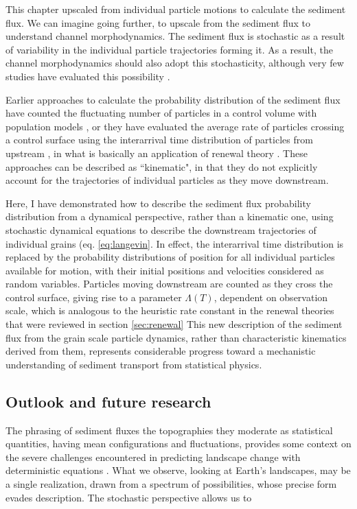 This chapter upscaled from individual particle motions to calculate the sediment flux.
We can imagine going further, to upscale from the sediment flux to understand channel morphodynamics.
The sediment flux is stochastic as a result of variability in the individual particle trajectories forming it.
As a result, the channel morphodynamics should also adopt this stochasticity, although very few studies have evaluated this possibility \citep{Bohorquez2016, Jerolmack2005}.




Earlier approaches to calculate the probability distribution of the sediment flux have counted the fluctuating number of particles in a control volume with population models \citep{Ancey2008,Ancey2014}, or they have evaluated the average rate of particles crossing a control surface using the interarrival time distribution of particles from upstream \citep{Turowski2010,Ancey2020,Heyman2013}, in what is basically an application of renewal theory \citep{Cox1962}.
These approaches can be described as ``kinematic", in that they do not explicitly account for the trajectories of individual particles as they move downstream.

Here, I have demonstrated how to describe the sediment flux probability distribution from a dynamical perspective, rather than a kinematic one, using stochastic dynamical equations to describe the downstream trajectories of individual grains (eq. \ref{eq:langevin}.
In effect, the interarrival time distribution is replaced by the probability distributions of position for all individual particles available for motion, with their initial positions and velocities considered as random variables.
Particles moving downstream are counted as they cross the control surface, giving rise to a parameter $\Lambda(T)$, dependent on observation scale, which is analogous to the heuristic rate constant in the renewal theories that were reviewed in section \ref{sec:renewal} \citep{Turowski2010,Ancey2020}
This new description of the sediment flux from the grain scale particle dynamics, rather than characteristic kinematics derived from them, represents considerable progress toward a mechanistic understanding of sediment transport from statistical physics.

\subsection{Outlook and future research}

The phrasing of sediment fluxes the topographies they moderate as statistical quantities, having mean configurations and fluctuations, provides some context on the severe challenges encountered in predicting landscape change with deterministic equations \citep{}.
What we observe, looking at Earth's landscapes, may be a single realization, drawn from a spectrum of possibilities, whose precise form evades description. 
The stochastic perspective allows us to 

